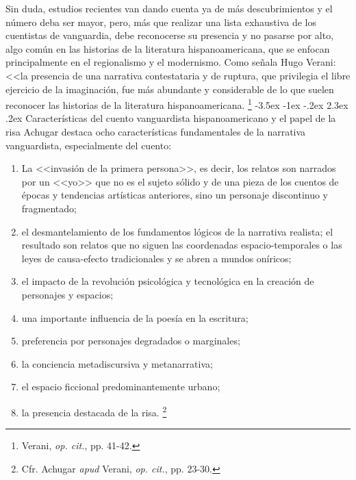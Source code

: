 \documentclass[14pt,twoside,final]{extbook} %
\makeatletter
\let\oldfootnote\footnote
\renewcommand\footnote[1]{%
\oldfootnote{\hspace{1mm}#1}}
\renewcommand\section{\@startsection {section}{1}{\z@}%
                                     {-3.5ex \@plus -1ex \@minus -.2ex}%
                                     {2.3ex \@plus .2ex}%
                                     {\normalfont\large\bfseries\sc}}
\makeatother
\begin{document}
Sin duda, estudios recientes van dando cuenta ya de más descubrimientos y el número deba ser mayor, pero, más que realizar una lista exhaustiva de los cuentistas de vanguardia, debe reconocerse su presencia y no pasarse por alto, algo común en las historias de la literatura hispanoamericana, que se enfocan principalmente en el regionalismo y el modernismo. Como señala Hugo Verani: <<la presencia de una narrativa contestataria y de ruptura, que privilegia el libre ejercicio de la imaginación, fue más abundante y considerable de lo que suelen reconocer las historias de la literatura hispanoamericana.\footnote{Verani, \emph{op. cit.}, pp. 41-42.}
\section{Características del cuento vanguardista hispanoamericano y el papel de la
risa}\label{sec:caracteristicas-del-cuento-vanguardista-hispanoamericano-y-el-papel-de-la-risa}
Achugar destaca ocho características fundamentales de la narrativa vanguardista,
especialmente del cuento:
\begin{enumerate}[noitemsep] %
\item[\textlf{1}]La <<invasión de la primera persona>>, es decir, los relatos son narrados por un <<yo>> que no es el sujeto sólido y de una pieza de los cuentos de épocas y tendencias artísticas anteriores, sino un personaje discontinuo y fragmentado;
\item[\textlf{2}]el desmantelamiento de los fundamentos lógicos de la narrativa realista; el resultado son relatos que no siguen las coordenadas espacio-temporales o las leyes de causa-efecto tradicionales y se abren a mundos oníricos;
\item[\textlf{3}]el impacto de la revolución psicológica y tecnológica en la creación de personajes y espacios;
\item[\textlf{4}]una importante influencia de la poesía en la escritura;
\item[\textlf{5}]preferencia por personajes degradados o marginales;
\item[\textlf{6}]la conciencia metadiscursiva y metanarrativa;
\item[\textlf{7}]el espacio ficcional predominantemente urbano;
\item[\textlf{8}]la presencia destacada de la risa.\footnote{Cfr. Achugar \emph{apud} Verani, \emph{op. cit.}, pp. 23-30.}
\end{enumerate}
\end{document}

